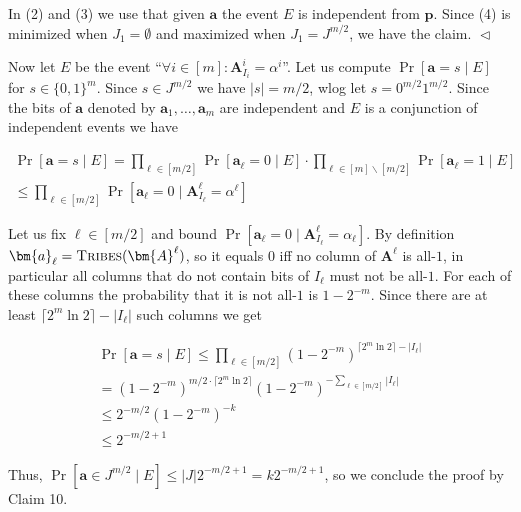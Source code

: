 In (2) and (3) we use that given $\bm{a}$ the event $E$ is
independent from $\bm{p}$. Since (4) is minimized when $J_{1}=\emptyset$ and
maximized when $J_{1}=J^{m/2}$, we have the claim.
$\vartriangleleft$\par




Now let $E$ be the event “$\forall i\in[m]\colon\bm{A}^{i}_{I_{i}}=\alpha^{i}$”.
Let us compute $\Pr[\bm{a}=s\mid E]$ for $s\in\{0,1\}^{m}$. Since $s\in J^{m/2}$ we have $|s|=m/2$, wlog let $s=0^{m/2}1^{m/2}$. Since the bits of $\bm{a}$ denoted by $\bm{a}_{1},\dots,\bm{a}_{m}$ are independent and $E$ is a conjunction of independent events we have\par


\[\begin{gathered}
\displaystyle\Pr[\bm{a}=s\mid E] \displaystyle=\prod_{\ell\in[m/2]}\Pr[\bm{a}_{\ell}=0\mid E]\cdot\prod_{\ell\in[m]\smallsetminus[m/2]}\Pr[\bm{a}_{\ell}=1\mid E] \\
\displaystyle\leq\prod_{\ell\in[m/2]}\Pr[\bm{a}_{\ell}=0\mid\bm{A}^{\ell}_{I_{\ell}}=\alpha^{\ell}]
\end{gathered}\]


Let us fix $\ell\in[m/2]$ and bound $\Pr[\bm{a}_{\ell}=0\mid\bm{A}^{\ell}_{I_{\ell}}=\alpha_{\ell}]$. By definition $\bm{a}_{\ell}=\textsc{Tribes}(\bm{A}^{\ell})$, so it equals $0$ iff no column of $\bm{A}^{\ell}$ is all-$1$, in particular all columns that do not contain bits of $I_{\ell}$ must not be all-$1$. For each of these columns the probability that it is not all-$1$ is $1-2^{-m}$. Since there are at least $\lceil 2^{m}\ln 2\rceil-|I_{\ell}|$ such columns we get\par


\[\begin{gathered}
\displaystyle\Pr[\bm{a}=s\mid E] \displaystyle\leq\prod_{\ell\in[m/2]}(1-2^{-m})^{\lceil 2^{m}\ln 2\rceil-|I_{\ell}|} \\
\displaystyle=(1-2^{-m})^{m/2\cdot\lceil 2^{m}\ln 2\rceil}(1-2^{-m})^{-\sum_{\ell\in[m/2]}|I_{\ell}|} \\
\displaystyle\leq 2^{-m/2}(1-2^{-m})^{-k} \\
\displaystyle\leq 2^{-m/2+1}
\end{gathered}\]


Thus, $\Pr[\bm{a}\in J^{m/2}\mid E]\leq|J|2^{-m/2+1}=k2^{-m/2+1}$, so we conclude the proof by Claim 10.\par






